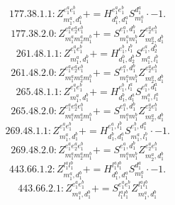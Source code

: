 \documentclass[letterpaper,10pt,fleqn,leqno,onecolumn]{article}
\begin{document}
\begin{equation} \;\;\;\;\;\;  177.38.1.1: Z^{e_{1}^{a}e_{1}^{b}}_{m_{1}^{a},d_{1}^{b}}+=H^{e_{1}^{a}e_{1}^{b}}_{d_{1}^{b},d_{1}^{a}}S^{d_{1}^{a}}_{m_{1}^{a}}\cdot -1. \end{equation}
\begin{equation} \;\;\;\;\;\;  177.38.2.0: Z^{e_{1}^{a}e_{2}^{a}e_{1}^{b}}_{m_{1}^{a}m_{2}^{a}m_{1}^{b}}+=S^{e_{1}^{a},d_{1}^{b}}_{m_{1}^{a}m_{1}^{b}}Z^{e_{2}^{a}e_{1}^{b}}_{m_{2}^{a},d_{1}^{b}} \end{equation}
\begin{equation} \;\;\;\;\;\;  261.48.1.1: Z^{e_{1}^{a}e_{1}^{b}}_{m_{1}^{a},d_{1}^{b}}+=H^{e_{1}^{b},l_{1}^{b}}_{d_{1}^{b},d_{2}^{b}}S^{e_{1}^{a},d_{2}^{b}}_{m_{1}^{a},l_{1}^{b}} \end{equation}
\begin{equation} \;\;\;\;\;\;  261.48.2.0: Z^{e_{1}^{a}e_{2}^{a}e_{1}^{b}}_{m_{1}^{a}m_{2}^{a}m_{1}^{b}}+=S^{e_{1}^{a},d_{1}^{b}}_{m_{1}^{a}m_{1}^{b}}Z^{e_{2}^{a}e_{1}^{b}}_{m_{2}^{a},d_{1}^{b}} \end{equation}
\begin{equation} \;\;\;\;\;\;  265.48.1.1: Z^{e_{1}^{a}e_{1}^{b}}_{m_{1}^{a},d_{1}^{b}}+=H^{e_{1}^{b},l_{1}^{a}}_{d_{1}^{b},d_{1}^{a}}S^{e_{1}^{a},d_{1}^{a}}_{m_{1}^{a},l_{1}^{a}} \end{equation}
\begin{equation} \;\;\;\;\;\;  265.48.2.0: Z^{e_{1}^{a}e_{2}^{a}e_{1}^{b}}_{m_{1}^{a}m_{2}^{a}m_{1}^{b}}+=S^{e_{1}^{a},d_{1}^{b}}_{m_{1}^{a}m_{1}^{b}}Z^{e_{2}^{a}e_{1}^{b}}_{m_{2}^{a},d_{1}^{b}} \end{equation}
\begin{equation} \;\;\;\;\;\;  269.48.1.1: Z^{e_{1}^{a}e_{1}^{b}}_{m_{1}^{a},d_{1}^{b}}+=H^{e_{1}^{a},l_{1}^{b}}_{d_{1}^{b},d_{1}^{a}}S^{e_{1}^{b},d_{1}^{a}}_{m_{1}^{a},l_{1}^{b}}\cdot -1. \end{equation}
\begin{equation} \;\;\;\;\;\;  269.48.2.0: Z^{e_{1}^{a}e_{2}^{a}e_{1}^{b}}_{m_{1}^{a}m_{2}^{a}m_{1}^{b}}+=S^{e_{1}^{a},d_{1}^{b}}_{m_{1}^{a}m_{1}^{b}}Z^{e_{2}^{a}e_{1}^{b}}_{m_{2}^{a},d_{1}^{b}} \end{equation}
\begin{equation} \;\;\;\;\;\;  443.66.1.2: Z^{l_{1}^{a}l_{1}^{b}}_{m_{1}^{a},d_{1}^{b}}+=H^{l_{1}^{a}l_{1}^{b}}_{d_{1}^{b},d_{1}^{a}}S^{d_{1}^{a}}_{m_{1}^{a}}\cdot -1. \end{equation}
\begin{equation} \;\;\;\;\;\;  443.66.2.1: Z^{e_{1}^{a}e_{1}^{b}}_{m_{1}^{a},d_{1}^{b}}+=S^{e_{1}^{a}e_{1}^{b}}_{l_{1}^{a}l_{1}^{b}}Z^{l_{1}^{a}l_{1}^{b}}_{m_{1}^{a},d_{1}^{b}} \end{equation}
\end{document}
